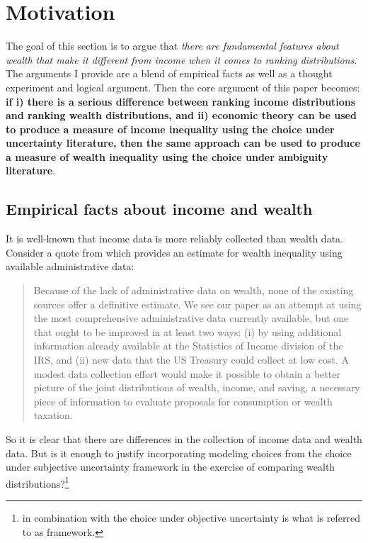 \documentclass[../../../00-main.tex]{subfiles}
\begin{document}
\section{Motivation}
\label{sec:Motivation}


\par The goal of this section is to argue that \textit{there are fundamental features about wealth that make it different from income when it comes to ranking distributions}. The arguments I provide are a blend of empirical facts as well as a thought experiment and logical argument. Then the core argument of this paper becomes: \textbf{if i) there is a serious difference between ranking income distributions and ranking wealth distributions, and  ii) economic theory can be used to produce a measure of income inequality using the choice under uncertainty literature, then the same approach can be used to produce a measure of wealth inequality using the choice under ambiguity literature}. 

\subsection{Empirical facts about income and wealth}

\par It is well-known that income data is more reliably collected than wealth data. Consider a quote from \cite{sz16} which provides an estimate for wealth inequality using available administrative data:

\begin{quote}

Because of the lack of administrative data on wealth, none of the existing sources offer a definitive estimate. We see our paper as an attempt at using the most comprehensive administrative data currently available, but one that ought to be improved in at least two ways: (i) by using additional information already available at the Statistics of Income division of the IRS, and (ii) new data that the US Treasury could collect at low cost. A modest data collection effort would make it possible to obtain a better picture of the joint distributions of wealth, income, and saving, a necessary piece of information to evaluate proposals for consumption or wealth taxation.

\end{quote}

\par So it is clear that there are differences in the collection of income data and wealth data. But is it enough to justify incorporating modeling choices from the choice under subjective uncertainty framework in the exercise of comparing wealth distributions?\footnote{in combination with the choice under objective uncertainty is what is referred to as  framework.} 
\end{document}
